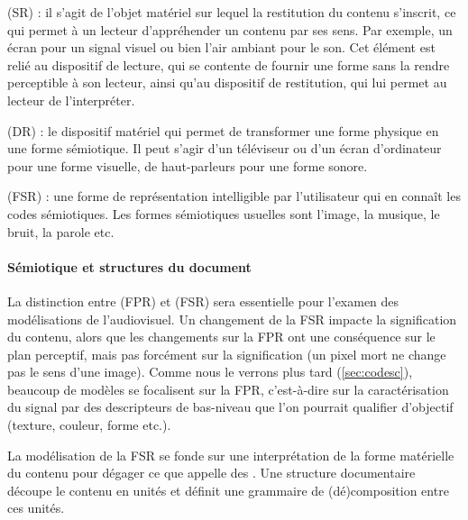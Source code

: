 \begin{listeni}
\begin{liste}
		\item {} (SR) : il s'agit de l'objet matériel sur lequel la restitution du contenu s'inscrit, ce qui permet à un lecteur d'appréhender un contenu par ses sens. 
		Par exemple, un écran pour un signal visuel ou bien l'air ambiant pour le son.
		Cet élément est relié au dispositif de lecture, qui se contente de fournir une forme sans la rendre perceptible à son lecteur, ainsi qu'au dispositif de restitution, qui lui permet au lecteur de l'interpréter.
		
		\item {} (DR) : le dispositif matériel qui permet de transformer une forme physique en une forme sémiotique.
		Il peut s'agir d'un téléviseur ou d'un écran d'ordinateur pour une forme visuelle, de haut-parleurs pour une forme sonore.
		
		\item {} (FSR) : une forme de représentation intelligible par l'utilisateur qui en connaît les codes sémiotiques.
		Les formes sémiotiques usuelles sont l'image, la musique, le bruit, la parole etc.
	\end{liste}
\end{listeni}



\paragraph{Sémiotique et structures du document}
La distinction entre  (FPR) et  (FSR) sera essentielle pour l'examen des modélisations de l'audiovisuel.
Un changement de la FSR impacte la signification du contenu, alors que les changements sur la FPR ont une conséquence sur le plan perceptif, mais pas forcément sur la signification (un pixel mort ne change pas le sens d'une image).
Comme nous le verrons plus tard (\ref{sec:codesc}), beaucoup de modèles se focalisent sur la FPR, c'est-à-dire sur la caractérisation du signal par des descripteurs de bas-niveau que l'on pourrait qualifier d'objectif (texture, couleur, forme etc.).

La modélisation de la FSR se fonde sur une interprétation de la forme matérielle du contenu pour dégager ce que \cite{Prie2000} appelle des .
Une structure documentaire découpe le contenu en unités et définit une grammaire de (dé)composition entre ces unités.

